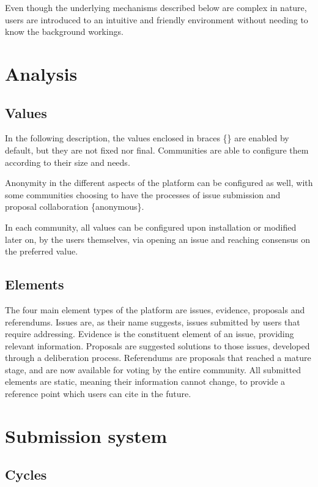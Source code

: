 \documentclass[a4paper,11pt]{article}
\begin{document}
\begin{multicols}{2}
Even though the underlying mechanisms described below are complex in nature, users are introduced to an intuitive and friendly environment without needing to know the background workings.

\section{Analysis} \label{analysis}

\subsection{Values} \label{values}

In the following description, the values enclosed in braces \{\} are enabled by default, but they are not fixed nor final. Communities are able to configure them according to their size and needs.

Anonymity in the different aspects of the platform can be configured as well, with some communities choosing to have the processes of issue submission and proposal collaboration \{anonymous\}.

In each community, all values can be configured upon installation or modified later on, by the users themselves, via opening an issue and reaching consensus on the preferred value.

\subsection{Elements} \label{elements}

The four main element types of the platform are issues, evidence, proposals and referendums. Issues are, as their name suggests, issues submitted by users that require addressing. Evidence is the constituent element of an issue, providing relevant information. Proposals are suggested solutions to those issues, developed through a deliberation process. Referendums are proposals that reached a mature stage, and are now available for voting by the entire community. All submitted elements are static, meaning their information cannot change, to provide a reference point which users can cite in the future.

\section{Submission system} \label{submissionsystem}

\subsection{Cycles} \label{cycles}


\end{multicols}
\end{document}
